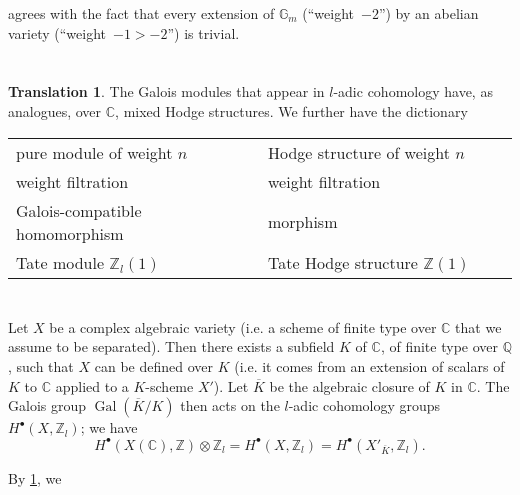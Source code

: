 \documentclass{article}
\theoremstyle{plain}
\theoremstyle{definition}
\newtheorem*{translation*}{Translation}
\newcommand{\ZZ}{\mathbb{Z}}
\newcommand{\QQ}{\mathbb{Q}}
\newcommand{\CC}{\mathbb{C}}
\DeclareMathOperator{\Gal}{Gal}
\newcommand{\oldpage}[1]{\marginpar{\footnotesize$\Big\vert$ \textit{p.~#1}}}
\begin{document}
 agrees with the fact that every extension of $\mathbb{G}_m$ (``weight~$-2$'') by an abelian variety (``weight~$-1>-2$'') is trivial.


\section{}
\label{3}

\begin{translation*}
  The Galois modules that appear in $l$-adic cohomology have, as analogues, over $\CC$, mixed Hodge structures.
  We further have the dictionary
  
  \bigskip
  \begin{tabular}{p{0.5\linewidth}|p{0.5\linewidth}}
    pure module of weight $n$
    & Hodge structure of weight $n$
  \\weight filtration
    & weight filtration
  \\Galois-compatible homomorphism
    & morphism
  \\Tate module $\ZZ_l(1)$
    & Tate Hodge structure $\ZZ(1)$
  \end{tabular}
\end{translation*}


\section{}
\label{4}

Let $X$ be a complex algebraic variety (i.e. a scheme of finite type over $\CC$ that we assume to be separated).
Then there exists a subfield $K$ of $\CC$, of finite type over $\QQ$, such that $X$ can be defined over $K$ (i.e. it comes from an extension of scalars of $K$ to $\CC$ applied to a $K$-scheme $X'$).
Let $\overline{K}$ be the algebraic closure of $K$ in $\CC$.
The Galois group $\Gal(\overline{K}/K)$ then acts on the $l$-adic cohomology groups $H^\bullet(X,\ZZ_l)$;
we have
\[
  H^\bullet(X(\CC),\ZZ)\otimes\ZZ_l
  = H^\bullet(X,\ZZ_l)
  = H^\bullet(X'_{\overline{K}},\ZZ_l).
\]

\oldpage{427}
By \cref{3}, we




\nocite{*}
\end{document}
